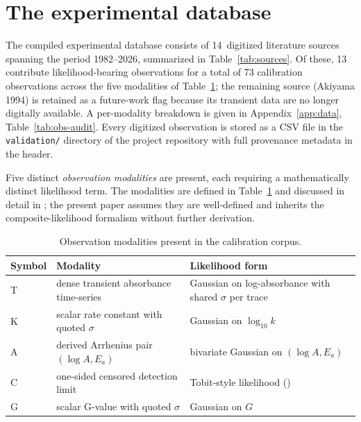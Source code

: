 \documentclass[11pt]{article}
\theoremstyle{plain}
\theoremstyle{definition}
\theoremstyle{remark}
\newcommand{\Ea}{E_a}
\begin{document}
\section{The experimental database}\label{sec:database}

The compiled experimental database consists of 14~digitized literature sources
spanning the period 1982--2026, summarized in Table~\ref{tab:sources}.  Of
these, 13 contribute likelihood-bearing observations for a total of 73
calibration observations across the five modalities of
Table~\ref{tab:modalities}; the remaining source (Akiyama 1994) is retained
as a future-work flag because its transient data are no longer digitally
available.  A per-modality breakdown is given in Appendix~\ref{app:data},
Table~\ref{tab:obs-audit}.  Every digitized observation is stored as a CSV
file in the \texttt{validation/} directory of the project repository with
full provenance metadata in the header.

Five distinct \emph{observation modalities} are present, each requiring a
mathematically distinct likelihood term.  The modalities are defined in
Table~\ref{tab:modalities} and discussed in detail in
\citet{Tanore2026PaperI}; the present paper assumes they are well-defined
and inherits the composite-likelihood formalism without further derivation.

\begin{table}[h!]
\centering
\caption{Observation modalities present in the calibration corpus.}
\label{tab:modalities}
\small
\begin{tabular}{lll}
\toprule
Symbol & Modality & Likelihood form \\
\midrule
T & dense transient absorbance time-series  &
  Gaussian on log-absorbance with shared $\sigma$ per trace \\
K & scalar rate constant with quoted $\sigma$ &
  Gaussian on $\log_{10}\!k$ \\
A & derived Arrhenius pair $(\log A, \Ea)$ &
  bivariate Gaussian on $(\log A, \Ea)$ \\
C & one-sided censored detection limit &
  Tobit-style likelihood (\citealp{Tobin1958}) \\
G & scalar G-value with quoted $\sigma$ &
  Gaussian on $G$ \\
\bottomrule
\end{tabular}
\end{table}
\end{document}
